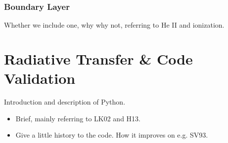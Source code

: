 \documentclass[preprint, a4paper, 11pt]{aastex}
\begin{document}
\subsubsection{Boundary Layer}
Whether we include one, why why not, referring to He II and ionization.


\newpage
%
%

\section{Radiative Transfer \& Code Validation}

Introduction and description of Python. 

\begin{itemize}
\item Brief, mainly referring to LK02 and H13. 
\item Give a little history to the code. How it improves on e.g. SV93.
\end{itemize}

\end{document}
